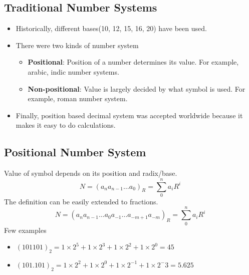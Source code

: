 \documentclass[oneside]{book}
\begin{document}
\subsection{Traditional Number Systems}
\begin{itemize}
	\item Historically, different bases(10, 12, 15, 16, 20) have been used.
	\item There were two kinds of number system
	      \begin{itemize}
		      \item \textbf{Positional}: Position of a number determines its value. For example, arabic, indic number systems.
		      \item \textbf{Non-positional}: Value is largely decided by what symbol is used. For example, roman number system.
	      \end{itemize}
	\item Finally, position based decimal system was accepted worldwide because it makes it easy to do calculations.
\end{itemize}

\subsection{Positional Number System}
Value of symbol depends on its position and radix/base.
\[
	N =
	(a_n a_{n-1} \ldots a_0)_R =
	\sum\limits_0^n a_i R^i
\]
The definition can be easily extended to fractions.
\[
	N =
	(a_n a_{n-1} \ldots a_0 a_{-1}\ldots a_{-m + 1} a_{-m})_R =
	\sum\limits_0^n a_i R^i
\]
Few examples
\begin{itemize}
	\item \(\displaystyle (101101)_2 = 1\times 2^{5} + 1\times 2^3 + 1\times 2^2 + 1\times 2^0 = 45\)
	\item \(\displaystyle (101.101)_2 = 1\times 2^{2} + 1\times 2^0 + 1\times 2^{-1} + 1\times 2^-3 = 5.625\)
\end{itemize}
\end{document}
